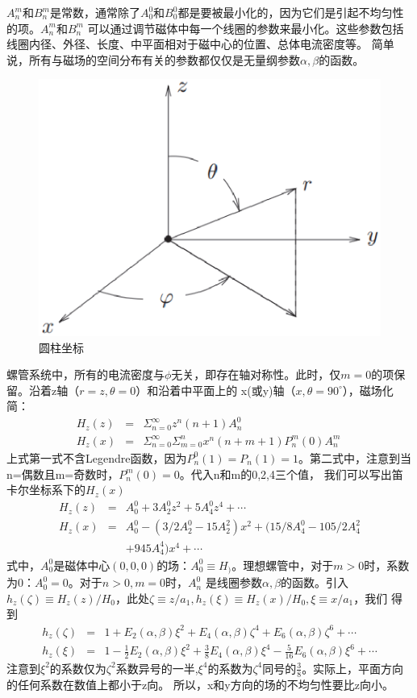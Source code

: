 $A_n^m$和$B_n^m$是常数，通常除了$A_0^0$和$B_0^0$都是要被最小化的，因为它们是引起不均匀性的项。$A_n^m$和$B_n^m$
可以通过调节磁体中每一个线圈的参数来最小化。这些参数包括线圈内径、外径、长度、中平面相对于磁中心的位置、总体电流密度等。
简单说，所有与磁场的空间分布有关的参数都仅仅是无量纲参数$\alpha, \beta$的函数。
\begin{figure}[htbp]
	\centering
	\includegraphics[scale=0.5]{chpt3/figs/fig3.4.eps}
	\caption{圆柱坐标}
\end{figure}

螺管系统中，所有的电流密度与$\phi$无关，即存在轴对称性。此时，仅$m=0$的项保留。沿着z轴（$r=z,\theta=0$）和沿着中平面上的
x(或y)轴（$x,\theta=90^\circ$），磁场化简：
\begin{eqnarray}\label{eqn:solenoid coil hz1}
H_z(z)&=&\Sigma_{n=0}^\infty z^n(n+1)A_n^0 \nonumber \\
H_z(x)&=&\Sigma_{n=0}^\infty \Sigma_{m=0}^n x^n(n+m+1)P_n^m(0)A_n^m\
\end{eqnarray}
上式第一式不含Legendre函数，因为$P_n^0(1)=P_n(1)=1$。第二式中，注意到当n=偶数且m=奇数时，$ P_n^m(0)=0$。代入n和m的0,2,4三个值，
我们可以写出笛卡尔坐标系下的$H_z(x)$
\begin{eqnarray}\label{eqn:solenoid coil hz2}
H_z(z)&=&A_0^0+3A_2^0z^2+5A_4^0z^4+\cdots \nonumber \\
H_z(x)&=&A_0^0-(3/2A_2^0-15A_2^2)x^2+(15/8 A_4^0-105/2 A_4^2\nonumber\\
&& +945A_4^4)x^4+\cdots
\end{eqnarray}
式中，$A_0^0$是磁体中心$(0,0,0)$的场：$A_0^0\equiv H_)$。理想螺管中，对于$m>0$时，系数为0：$A_0^0=0$。对于$n>0, m=0$时，$A_n^0$
是线圈参数$\alpha, \beta$的函数。引入$h_z(\zeta)\equiv H_z(z)/H_0$，此处$\zeta \equiv z/a_1, h_z(\xi)\equiv H_z(x)/H_0, \xi\equiv x/a_1$，我们
得到
\begin{eqnarray}\label{eqn:solenoid coil hz2}
h_z(\zeta)&=&1+E_2(\alpha,\beta)\xi^2+E_4(\alpha,\beta)\zeta^4+E_6(\alpha,\beta)\zeta^6+\cdots \nonumber \\
h_z(\xi) &=&1-\frac{1}{2}E_2(\alpha,\beta)\xi^2+\frac{3}{8}E_4(\alpha,\beta)\xi^4-\frac{5}{16}E_6(\alpha,\beta)\xi^6+\cdots
\end{eqnarray}
注意到$\xi^2$的系数仅为$\zeta^2$系数异号的一半,$\xi^4$的系数为$\zeta^4$同号的$\frac{3}{8}$。实际上，平面方向的任何系数在数值上都小于z向。
所以，x和y方向的场的不均匀性要比z向小。

